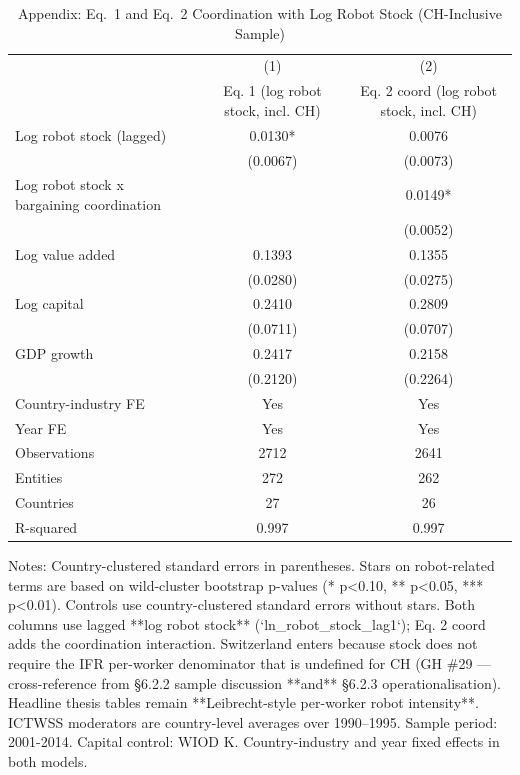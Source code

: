 \begin{table}[!htbp]
\centering
\begin{threeparttable}
\caption{Appendix: Eq.\ 1 and Eq.\ 2 Coordination with Log Robot Stock (CH-Inclusive Sample)}
\label{tab:wiod_appendix_robot_stock_ch_inclusive}
\small
\begin{tabular}{lcc}
\toprule
 & (1) & (2) \\
 & Eq. 1 (log robot stock, incl. CH) & Eq. 2 coord (log robot stock, incl. CH) \\
\midrule
Log robot stock (lagged) & 0.0130* & 0.0076 \\
 & (0.0067) & (0.0073) \\
\addlinespace[0.2em]
Log robot stock x bargaining coordination &  & 0.0149* \\
 &  & (0.0052) \\
\addlinespace[0.2em]
Log value added & 0.1393 & 0.1355 \\
 & (0.0280) & (0.0275) \\
\addlinespace[0.2em]
Log capital & 0.2410 & 0.2809 \\
 & (0.0711) & (0.0707) \\
\addlinespace[0.2em]
GDP growth & 0.2417 & 0.2158 \\
 & (0.2120) & (0.2264) \\
\midrule
Country-industry FE & Yes & Yes \\
Year FE & Yes & Yes \\
Observations & 2712 & 2641 \\
Entities & 272 & 262 \\
Countries & 27 & 26 \\
R-squared & 0.997 & 0.997 \\
\bottomrule
\end{tabular}
\begin{tablenotes}[flushleft]
\footnotesize
\item Notes: Country-clustered standard errors in parentheses. Stars on robot-related terms are based on wild-cluster bootstrap p-values (* p<0.10, ** p<0.05, *** p<0.01). Controls use country-clustered standard errors without stars. Both columns use lagged **log robot stock** (`ln\_robot\_stock\_lag1`); Eq. 2 coord adds the coordination interaction. Switzerland enters because stock does not require the IFR per-worker denominator that is undefined for CH (GH \#29 — cross-reference from §6.2.2 sample discussion **and** §6.2.3 operationalisation). Headline thesis tables remain **Leibrecht-style per-worker robot intensity**. ICTWSS moderators are country-level averages over 1990–1995. Sample period: 2001-2014. Capital control: WIOD K. Country-industry and year fixed effects in both models.
\end{tablenotes}
\end{threeparttable}
\end{table}
